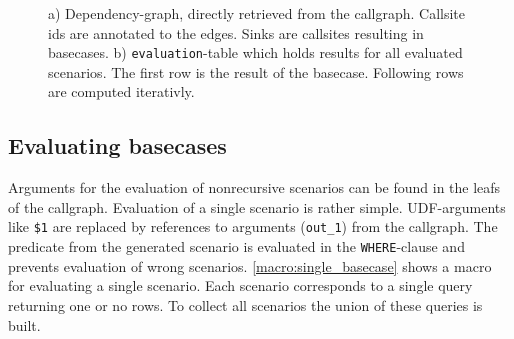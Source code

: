 \begin{figure}[h!]\small
    \begin{minipage}[b]{.45\linewidth}\small
    \centering
{}
    \subcaption{}\label{}
    \end{minipage}%
    \hfill
    \begin{minipage}[b]{.45\linewidth}\small
    \centering
    
    \subcaption{}\label{fig:fib_callstack_cte}
    \end{minipage}
    \caption{a) Dependency-graph, directly retrieved from the callgraph. Callsite ids are annotated to the edges. Sinks are callsites resulting in basecases. b) \texttt{evaluation}-table which holds results for all evaluated scenarios. The first row is the result of the basecase. Following rows are computed iterativly.}\label{}
    \vspace*{-1cm}
\end{figure}

\subsection{Evaluating basecases}
Arguments for the evaluation of nonrecursive scenarios can be found in the leafs of the callgraph.
Evaluation of a single scenario is rather simple. UDF-arguments like \texttt{\$1} are replaced by references to arguments (\texttt{out\_1}) from the callgraph. The predicate from the generated scenario is evaluated in the \texttt{WHERE}-clause and prevents evaluation of wrong scenarios. \autoref{macro:single_basecase} shows a macro for evaluating a single scenario. Each scenario corresponds to a single query returning one or no rows. To collect all scenarios the union of these queries is built.

